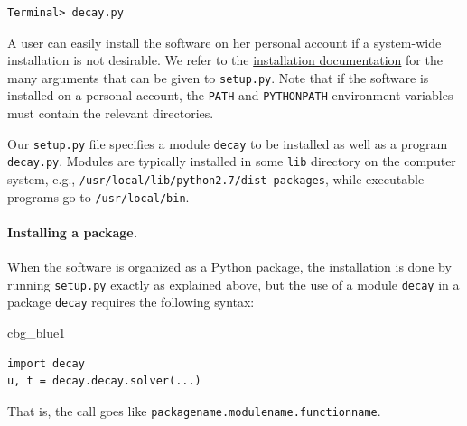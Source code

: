 \documentclass[%
oneside,                 %
final,                   %
10pt]{article}
\newenvironment{_cod_tight}[1]{
   \def\FrameCommand{\colorbox{#1}}
   \FrameRule0.6pt\MakeFramed {\FrameRestore}\vskip3mm}
   {\vskip0mm\endMakeFramed}
\newenvironment{cod}[1]{
\bgroup\rmfamily
\fboxsep=0mm\relax
\begin{_cod_tight}{#1}
\list{}{\parsep=-2mm\parskip=0mm\topsep=0pt\leftmargin=2mm
\rightmargin=2\leftmargin\leftmargin=4pt\relax}
\item\relax}
{\endlist\end{_cod_tight}\egroup}
\begin{document}
\begin{Verbatim}[frame=lines,label=\fbox{{\tiny Terminal}},framesep=2.5mm,framerule=0.7pt,fontsize=\fontsize{9pt}{9pt}]
Terminal> decay.py
\end{Verbatim}

A user can easily install the software on her personal account if
a system-wide installation is not desirable. We refer to the
\href{{https://docs.python.org/2/install/index.html#alternate-installation}}{installation documentation} for the many arguments that can be given to \texttt{setup.py}.
Note that if the software is installed on a personal account, the
\texttt{PATH} and \texttt{PYTHONPATH} environment variables must contain the
relevant directories.

Our \texttt{setup.py} file specifies a module \texttt{decay} to be installed as well
as a program \texttt{decay.py}.  Modules are typically installed in some \texttt{lib}
directory on the computer system, e.g.,
\texttt{/usr/local/lib/python2.7/dist-packages}, while executable programs go
to \texttt{/usr/local/bin}.


\paragraph{Installing a package.}
When the software is organized as a Python package, the installation is
done by running \texttt{setup.py} exactly as explained above, but the use of a module
\texttt{decay} in a package \texttt{decay} requires the following syntax:

\begin{cod}{cbg_blue1}\begin{Verbatim}[numbers=none,fontsize=\fontsize{9pt}{9pt},baselinestretch=0.95,xleftmargin=2mm]
import decay
u, t = decay.decay.solver(...)
\end{Verbatim}
\end{cod}
\noindent
That is, the call goes like \texttt{packagename.modulename.functionname}.
\end{document}
